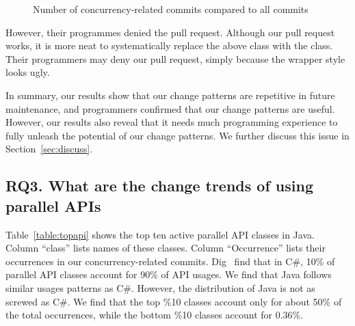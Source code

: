 \begin{figure}
	\caption{Number of concurrency-related commits compared to all commits}%
	\label{fig:confidence}\vspace*{-3ex}
\end{figure}

However, their programmes denied the pull request. Although our pull request works, it is more neat to systematically replace the above  class with the  class. Their programmers may deny our pull request, simply because the wrapper style looks ugly.

In summary, our results show that our change patterns are repetitive in future maintenance, and programmers confirmed that our change patterns are useful. However, our results also reveal that it needs much programming experience to fully unleash the potential of our change patterns. We further discuss this issue in Section~\ref{sec:discuss}.

\subsection{RQ3. What are the change trends of using parallel APIs}
\label{sec:result:trend}


%
Table~\ref{table:topapi} shows the top ten active parallel API classes in Java. Column ``class'' lists names of these classes. Column ``Occurrence'' lists their occurrences in our concurrency-related commits. Dig~\cite{conf/sigsoft/OkurD12} find that in C\#, 10\% of parallel API classes account for 90\% of API usages. We find that Java follows similar usages patterns as C\#. However, the distribution of Java is not as screwed as C\#. We find that the top \%10 classes account only for about 50\% of the total occurrences, while the bottom \%10 classes account for 0.36\%.

